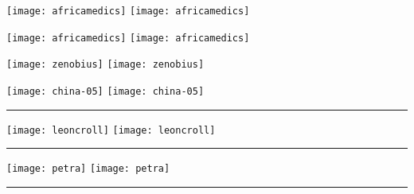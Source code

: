 \documentclass{book}
\makeatletter
\newcommand{\cleartoevenpage}{%
  \clearpage%
  \ifoddpage\c@page\hbox{}\clearpage\fi}
\makeatother
\begin{document}
\mbox{}


\cleartoevenpage
\texttt{[image: africamedics]}
\newpage
\hspace*{-\textwidth}\texttt{[image: africamedics]}\hspace{1em}
\parbox[b]{0.3\textwidth}{\lipsum*[1-2]}


\cleartoevenpage
\texttt{[image: africamedics]}
\newpage
\hspace*{-\textwidth}\texttt{[image: africamedics]}\hspace{1em}
\parbox[b]{0.3\textwidth}{\lipsum*[1-2]}

\cleartoevenpage
\texttt{[image: zenobius]}
\newpage
\hspace*{-\textwidth}\texttt{[image: zenobius]}\hspace{1em}
\endminipage



\cleartoevenpage
\texttt{[image: china-05]}
\newpage
\hspace*{-\textwidth}\texttt{[image: china-05]}\hspace{1em}
\parbox[b]{0.3\textwidth}{\lipsum*[1-2]\par \rule{1pt}{160pt}}


\cleartoevenpage
\texttt{[image: leoncroll]}
\newpage
\hspace*{-\textwidth}\texttt{[image: leoncroll]}\hspace{1em}
\parbox[b]{0.3\textwidth}{\lipsum*[1-2]\par \rule{1pt}{160pt}}

\cleartoevenpage
\texttt{[image: petra]}
\newpage
\hspace*{-\textwidth}\texttt{[image: petra]}\hspace{1em}
\parbox[b]{0.25\textwidth}{\lipsum*[1-2]\par \rule{1pt}{0pt}}
\end{document}
